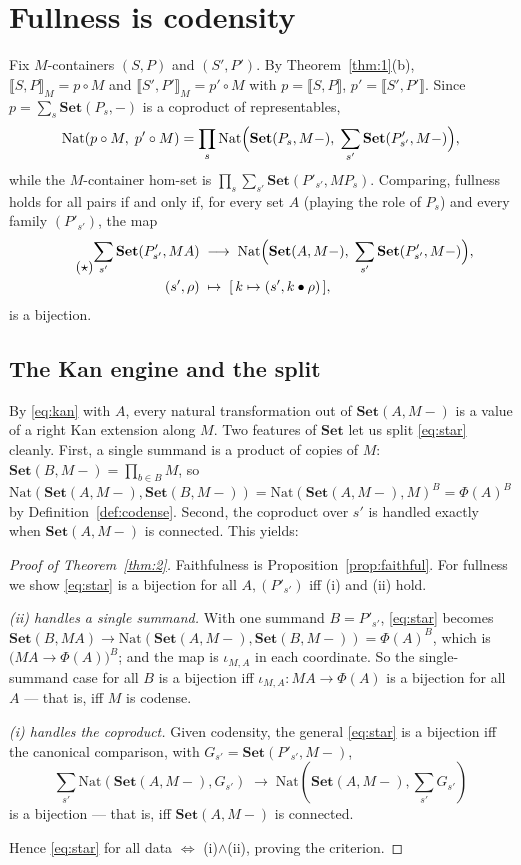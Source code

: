 \documentclass[11pt]{amsart}
\theoremstyle{plain}
\theoremstyle{definition}
\newcommand{\Set}{\mathbf{Set}}
\newcommand{\Nat}{\mathrm{Nat}}
\newcommand{\ext}[1]{\llbracket #1 \rrbracket}
\newcommand{\extM}[1]{\llbracket #1 \rrbracket_{M}}
\begin{document}
\section{Fullness is codensity}\label{sec:full}

Fix $M$-containers $(S,P)$ and $(S',P')$. By Theorem~\ref{thm:1}(b), $\extM{S,P}=p\circ M$ and
$\extM{S',P'}=p'\circ M$ with $p=\ext{S,P}$, $p'=\ext{S',P'}$. Since $p=\sum_s\Set(P_s,-)$ is a
coproduct of representables,
\begin{equation}\label{eq:homnat}
  \Nat(p\circ M,\;p'\circ M)=\prod_{s}\Nat\Bigl(\Set(P_s,M{-}),\;\sum_{s'}\Set(P'_{s'},M{-})\Bigr),
\end{equation}
while the $M$-container hom-set is $\prod_s\sum_{s'}\Set(P'_{s'},MP_s)$. Comparing, fullness
holds for all pairs if and only if, for every set $A$ (playing the role of $P_s$) and every family
$(P'_{s'})$, the map
\begin{equation}\label{eq:star}\tag{$\star$}
\begin{aligned}
  \sum_{s'}\Set(P'_{s'},MA)&\;\longrightarrow\;\Nat\Bigl(\Set(A,M{-}),\;\sum_{s'}\Set(P'_{s'},M{-})\Bigr),\\
  (s',\rho)&\;\mapsto\;[\,k\mapsto(s',k\bullet\rho)\,],
\end{aligned}
\end{equation}
is a bijection.

\subsection{The Kan engine and the split}
By \eqref{eq:kan} with $A$, every natural transformation out of $\Set(A,M{-})$ is a value of a right
Kan extension along $M$. Two features of $\Set$ let us split \eqref{eq:star} cleanly. First, a
single summand is a product of copies of $M$: $\Set(B,M{-})=\prod_{b\in B}M$, so
$\Nat(\Set(A,M{-}),\Set(B,M{-}))=\Nat(\Set(A,M{-}),M)^{B}=\Phi(A)^B$ by
Definition~\ref{def:codense}. Second, the coproduct over $s'$ is handled exactly when
$\Set(A,M{-})$ is connected. This yields:

\begin{proof}[Proof of Theorem~\ref{thm:2}]
Faithfulness is Proposition~\ref{prop:faithful}. For fullness we show \eqref{eq:star} is a bijection
for all $A,(P'_{s'})$ iff (i) and (ii) hold.

\emph{(ii) handles a single summand.} With one summand $B=P'_{s'}$, \eqref{eq:star} becomes
$\Set(B,MA)\to\Nat(\Set(A,M{-}),\Set(B,M{-}))=\Phi(A)^B$, which is $\bigl(MA\to\Phi(A)\bigr)^B$; and
the map is $\iota_{M,A}$ in each coordinate. So the single-summand case for all $B$ is a bijection
iff $\iota_{M,A}\colon MA\to\Phi(A)$ is a bijection for all $A$ --- that is, iff $M$ is codense.

\emph{(i) handles the coproduct.} Given codensity, the general \eqref{eq:star} is a bijection iff the
canonical comparison, with $G_{s'}=\Set(P'_{s'},M{-})$,
\[
  \textstyle\sum_{s'}\Nat(\Set(A,M{-}),G_{s'})\;\longrightarrow\;\Nat(\Set(A,M{-}),\sum_{s'}G_{s'})
\]
is a bijection --- that is, iff $\Set(A,M{-})$ is connected.

Hence \eqref{eq:star} for all data $\iff$ (i)$\wedge$(ii), proving the criterion.
\end{proof}
\end{document}
